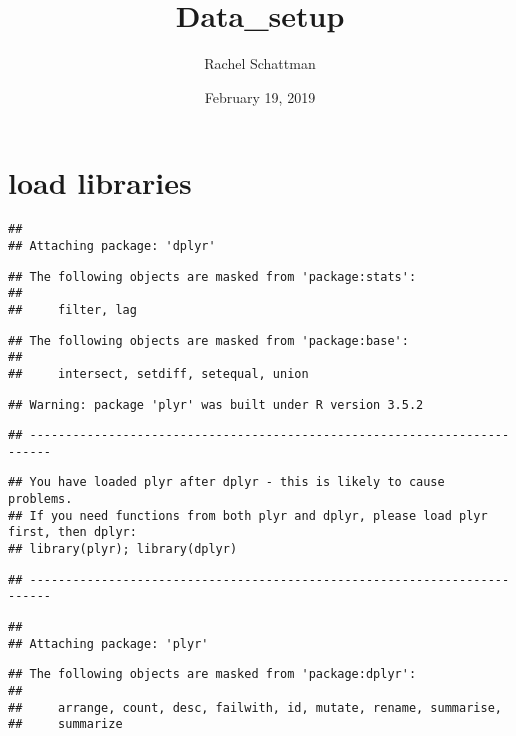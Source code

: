 \documentclass[]{article}
\title{Data\_setup}
\author{Rachel Schattman}
\date{February 19, 2019}
\begin{document}
\maketitle

\section{load libraries}\label{load-libraries}

\begin{verbatim}
## 
## Attaching package: 'dplyr'
\end{verbatim}

\begin{verbatim}
## The following objects are masked from 'package:stats':
## 
##     filter, lag
\end{verbatim}

\begin{verbatim}
## The following objects are masked from 'package:base':
## 
##     intersect, setdiff, setequal, union
\end{verbatim}

\begin{verbatim}
## Warning: package 'plyr' was built under R version 3.5.2
\end{verbatim}

\begin{verbatim}
## -------------------------------------------------------------------------
\end{verbatim}

\begin{verbatim}
## You have loaded plyr after dplyr - this is likely to cause problems.
## If you need functions from both plyr and dplyr, please load plyr first, then dplyr:
## library(plyr); library(dplyr)
\end{verbatim}

\begin{verbatim}
## -------------------------------------------------------------------------
\end{verbatim}

\begin{verbatim}
## 
## Attaching package: 'plyr'
\end{verbatim}

\begin{verbatim}
## The following objects are masked from 'package:dplyr':
## 
##     arrange, count, desc, failwith, id, mutate, rename, summarise,
##     summarize
\end{verbatim}
\end{document}
